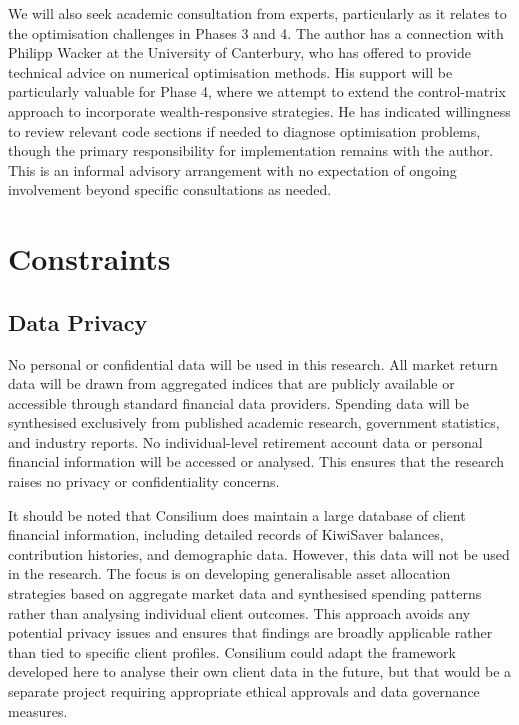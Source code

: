 \documentclass[11pt]{article}
\begin{document}
We will also seek academic consultation from experts, particularly as it relates to the optimisation challenges in Phases 3 and 4. The author has a connection with Philipp Wacker at the University of Canterbury, who has offered to provide technical advice on numerical optimisation methods. His support will be particularly valuable for Phase 4, where we attempt to extend the control-matrix approach to incorporate wealth-responsive strategies. He has indicated willingness to review relevant code sections if needed to diagnose optimisation problems, though the primary responsibility for implementation remains with the author. This is an informal advisory arrangement with no expectation of ongoing involvement beyond specific consultations as needed.

\section{Constraints}

\subsection{Data Privacy}

No personal or confidential data will be used in this research. All market return data will be drawn from aggregated indices that are publicly available or accessible through standard financial data providers. Spending data will be synthesised exclusively from published academic research, government statistics, and industry reports. No individual-level retirement account data or personal financial information will be accessed or analysed. This ensures that the research raises no privacy or confidentiality concerns.

It should be noted that Consilium does maintain a large database of client financial information, including detailed records of KiwiSaver balances, contribution histories, and demographic data. However, this data will not be used in the research. The focus is on developing generalisable asset allocation strategies based on aggregate market data and synthesised spending patterns rather than analysing individual client outcomes. This approach avoids any potential privacy issues and ensures that findings are broadly applicable rather than tied to specific client profiles. Consilium could adapt the framework developed here to analyse their own client data in the future, but that would be a separate project requiring appropriate ethical approvals and data governance measures.
\end{document}
